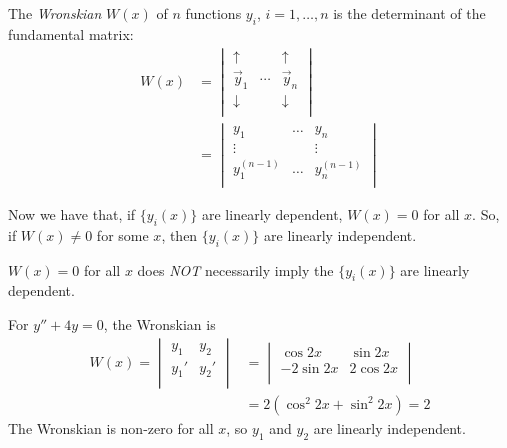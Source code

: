\documentclass{../../template/note}
\begin{document}
    \begin{definition}
        The \emph{Wronskian} \(W(x)\) of \(n\) functions \(y_i\), \(i = 1, \dots, n\) is the determinant of the fundamental matrix:
        \begin{align*}
            W(x) &= \begin{vmatrix}
              \uparrow &  & \uparrow \\
              \vec y_1 & \cdots & \vec y_n \\
              \downarrow &  & \downarrow \\
            \end{vmatrix} \\
            &= \begin{vmatrix}
             y_1 & \dots & y_n \\
             \vdots &  & \vdots \\
             y_1^{(n-1)} & \dots & y_n^{(n-1)} \\
            \end{vmatrix}
        \end{align*}
    \end{definition}
    
    Now we have that, if \(\{y_i(x)\}\) are linearly dependent, \(W(x) = 0\) for all \(x\). So, if \(W(x) \neq 0\) for some \(x\), then \(\{y_i(x)\}\) are linearly independent.

    \begin{remark*}
        \(W(x) = 0\) for all \(x\) does \emph{NOT} necessarily imply the \(\{y_i(x)\}\) are linearly dependent.
    \end{remark*}
    
    \begin{example}
        For \(y'' + 4y = 0\), the Wronskian is
        \begin{align*}
            W(x) = \begin{vmatrix}
             y_1 & y_2 \\
             y_1' & y_2' \\
            \end{vmatrix} &= \begin{vmatrix}
             \cos 2x & \sin 2x \\
             -2 \sin 2x & 2 \cos 2x \\
            \end{vmatrix} \\
            &= 2(\cos^2 2x + \sin^2 2x) = 2
        \end{align*}
        The Wronskian is non-zero for all \(x\), so \(y_1\) and \(y_2\) are linearly independent.
    \end{example}
\end{document}
